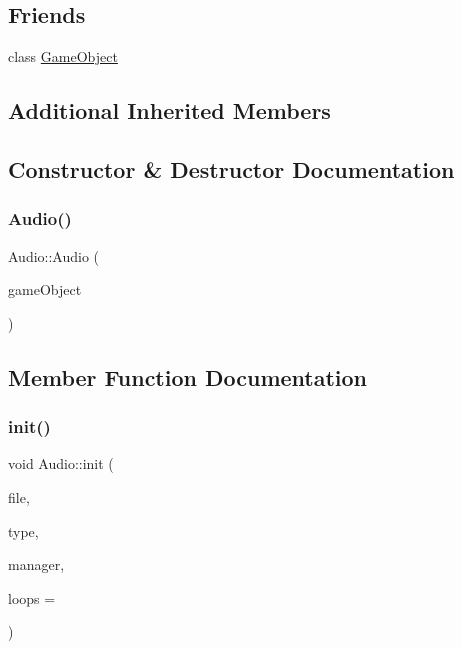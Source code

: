 \subsection*{Friends}
\begin{DoxyCompactItemize}
\item 
class \hyperlink{class_mason_1_1_audio_a00df87c957d8f7ee0fc51f07a0542f4a}{Game\+Object}
\end{DoxyCompactItemize}
\subsection*{Additional Inherited Members}


\subsection{Constructor \& Destructor Documentation}
\hypertarget{class_mason_1_1_audio_a433e686e47efeff747a71a847e8ae83a}{}\label{class_mason_1_1_audio_a433e686e47efeff747a71a847e8ae83a} 
\subsubsection{\texorpdfstring{Audio()}{Audio()}}
{\footnotesize\ttfamily Audio\+::\+Audio (\begin{DoxyParamCaption}\item[{\hyperlink{class_mason_1_1_game_object}{Game\+Object} $\ast$}]{game\+Object }\end{DoxyParamCaption})\hspace{0.3cm}{\ttfamily [protected]}}



\subsection{Member Function Documentation}
\hypertarget{class_mason_1_1_audio_a5d4f318f5bee0b59d1a4289495b01b4c}{}\label{class_mason_1_1_audio_a5d4f318f5bee0b59d1a4289495b01b4c} 
\subsubsection{\texorpdfstring{init()}{init()}}
{\footnotesize\ttfamily void Audio\+::init (\begin{DoxyParamCaption}\item[{std\+::string}]{file,  }\item[{\hyperlink{namespace_mason_a158d651086d1ba1aacc4c37125b27657}{Sound\+Type}}]{type,  }\item[{\hyperlink{class_mason_1_1_audio_manager}{Audio\+Manager} $\ast$}]{manager,  }\item[{int}]{loops = {} }\end{DoxyParamCaption})}

